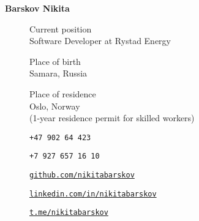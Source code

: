     \large\textbf{Barskov Nikita}
    \normalsize
    \begin{multicols}{2}
        \begin{description}
            \item[\faSuitcase] Current position \\
            Software Developer at Rystad Energy
        \end{description}
        \begin{description}
            \item[\faMapPin] Place of birth \\
             Samara, Russia
        \end{description}
        \begin{description}
            \item[\faMapMarker] Place of residence \\
            Oslo, Norway \\
            (1-year residence permit for skilled workers) 
        \end{description}
        \columnbreak
        \begin{description}
            \item[\faPhone] \texttt{+47 902 64 423}
            \item[\faPhone] \texttt{+7 927 657 16 10}
            \item[\faGithub] \href{https://github.com/nikitabarskov}{\texttt{github.com/nikitabarskov}}
            \item[\faLinkedin] \href{https://linkedin.com/in/nikitabarskov}{\texttt{linkedin.com/in/nikitabarskov}}
            \item[\faPaperPlane] \href{https://t.me/nikitabarskov}{\texttt{t.me/nikitabarskov}}
        \end{description}
    \end{multicols}